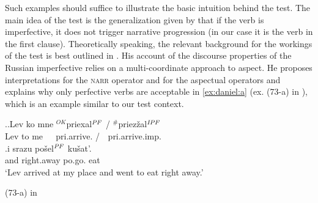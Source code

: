 Such examples should suffice to illustrate the basic intuition behind the test. The main idea of the test is the generalization given by \citet{Jespersen:24} that if the verb is imperfective, it does not trigger narrative progression (in our case it is the verb in the first clause). Theoretically speaking, the relevant background for the workings of the test is best outlined in \citet{Altshuler:12}.
His account of the discourse properties of the Russian imperfective  relies on a multi-coordinate approach to aspect. He proposes interpretations for the \textsc{narr} operator and for the aspectual operators and explains why only perfective verbs are acceptable in \ref{ex:daniel:a} (ex. (73-a) in \citealt{Altshuler:12}), which is an example similar to our test context.

\ex.\label{ex:daniel}\ag.\label{ex:daniel:a}Lev ko mne {{$^{OK}$}priexal$^{\mathit{PF}}$} / {{$^{\#}$}priez\v{z}al$^{\mathit{IPF}}$}\\
Lev to me {\textcolor{white}{$^{OK}$}pri.arrive.} / {{\textcolor{white} {$^{\#}$}}pri.arrive.imp.}\\
\bg.i srazu po\v{s}el$^{\mathit{PF}}$ ku\v{s}at'.\\
and right.away po.go. eat\\
\vspace{0.5 em}
`Lev arrived at my place and went to eat right away.'
\begin{flushright}
\vspace{-0.5em}
(73-a) in \citealt{Altshuler:12}
\end{flushright}


